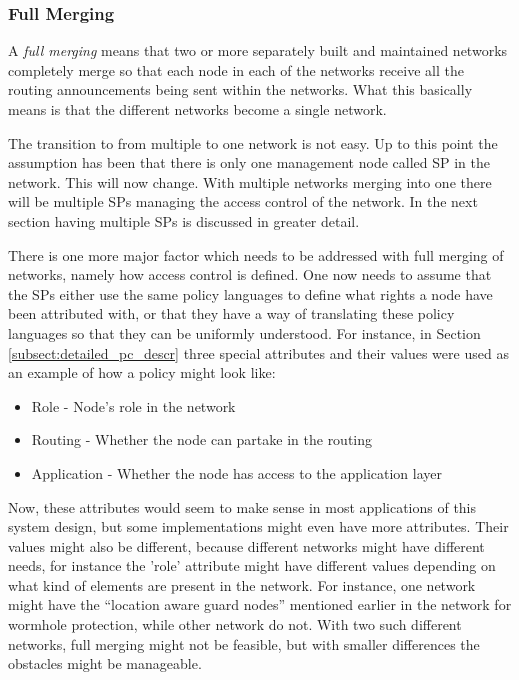 \subsubsection*{Full Merging}
A \emph{full merging} means that two or more separately built and maintained
networks completely merge so that each node in each of the networks receive
all the routing announcements being sent within the networks. What this
basically means is that the different networks become a single network.

The transition to from multiple to one network is not easy. Up to this point
the assumption has been that there is only one management node called \ac{SP}
in the network. This will now change. With multiple networks merging into one
there will be multiple \acp{SP} managing the access control of the network. In
the next section having multiple \acp{SP} is discussed in greater detail.

There is one more major factor which needs to be addressed with full merging of
networks, namely how access control is defined. One now needs to assume that the
\acp{SP} either use the same policy languages to define what rights a node have
been attributed with, or that they have a way of translating these policy
languages so that they can be uniformly understood. For instance, in Section
\ref{subsect:detailed_pc_descr} three special attributes and their values were
used as an example of how a policy might look like:

\begin{itemize}
  \item Role - Node's role in the network
  \item Routing - Whether the node can partake in the routing
  \item Application - Whether the node has access to the application layer
\end{itemize}

Now, these attributes would seem to make sense in most applications of this
system design, but some implementations might even have more attributes. Their
values might also be different, because different networks might have different
needs, for instance the 'role' attribute might have different values depending
on what kind of elements are present in the network. For instance, one network
might have the ``location aware guard nodes'' mentioned earlier in the network
for wormhole protection, while other network do not. With two such different
networks, full merging might not be feasible, but with smaller differences the
obstacles might be manageable.

